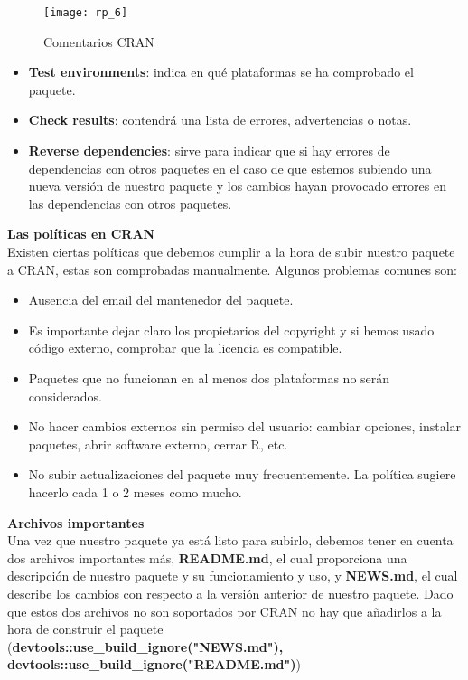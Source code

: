 \begin{figure}[H]
    \centering
    \texttt{[image: rp\_6]}
    \caption{Comentarios CRAN}
    \label{fig:comentarios}
\end{figure} 
\begin{itemize}

    \item \textbf{Test environments}: indica en qu\'e plataformas se ha comprobado el paquete.
    \item \textbf{Check results}: contendr\'a una lista de errores, advertencias o notas.
    \item \textbf{Reverse dependencies}: sirve para indicar que si hay errores de dependencias con
otros paquetes en el caso de que estemos subiendo una nueva versi\'on de nuestro
paquete y los cambios hayan provocado errores en las dependencias con otros
paquetes.
\end{itemize}

\textbf{Las pol\'iticas en CRAN}\\
Existen ciertas pol\'iticas que debemos cumplir a la hora de subir nuestro paquete a CRAN,
estas son comprobadas manualmente.
Algunos problemas comunes son:
\begin{itemize}
    \item Ausencia del email del mantenedor del paquete. 
    \item Es importante dejar claro los propietarios del copyright y si hemos usado c\'odigo
externo, comprobar que la licencia es compatible.
    \item Paquetes que no funcionan en al menos dos plataformas no ser\'an considerados.
    \item No hacer cambios externos sin permiso del usuario: cambiar opciones, instalar
paquetes, abrir software externo, cerrar R, etc.
    \item No subir actualizaciones del paquete muy frecuentemente. La pol\'itica sugiere hacerlo
cada 1 o 2 meses como mucho.
\end{itemize}

\textbf{Archivos importantes}\\
Una vez que nuestro paquete ya est\'a listo para subirlo, debemos tener en cuenta dos archivos
importantes m\'as,\textbf{ README.md}, el cual proporciona una descripci\'on de nuestro paquete y su
funcionamiento y uso, y \textbf{NEWS.md}, el cual describe los cambios con respecto a la versi\'on
anterior de nuestro paquete. Dado que estos dos archivos no son soportados por CRAN no
hay que a\~nadirlos a la hora de construir el paquete\\ (\textbf{devtools::use\_build\_ignore("NEWS.md"),
devtools::use\_build\_ignore("README.md")})

